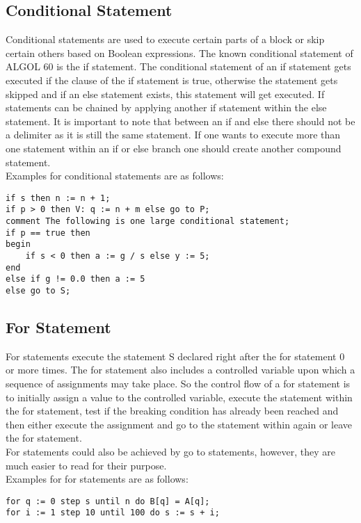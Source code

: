 \documentclass{article}
\begin{document}
\subsection{Conditional Statement}
Conditional statements are used to execute certain parts of a block or skip certain others based on Boolean expressions. The known conditional statement of ALGOL 60 is the if statement. The conditional statement of an if statement gets executed if the clause of the if statement is true, otherwise the statement gets skipped and if an else statement exists, this statement will get executed. If statements can be chained by applying another if statement within the else statement. It is important to note that between an if and else there should not be a delimiter as it is still the same statement. If one wants to execute more than one statement within an if or else branch one should create another compound statement.\\

Examples for conditional statements are as follows:\\ 
\begin{lstlisting}[language={[60]algol}]
if s then n := n + 1;
if p > 0 then V: q := n + m else go to P;
comment The following is one large conditional statement;
if p == true then 
begin 
    if s < 0 then a := g / s else y := 5; 
end
else if g != 0.0 then a := 5
else go to S;
\end{lstlisting}

\subsection{For Statement}
For statements execute the statement S declared right after the for statement 0 or more times. The for statement also includes a controlled variable upon which a sequence of assignments may take place. So the control flow of a for statement is to initially assign a value to the controlled variable, execute the statement within the for statement, test if the breaking condition has already been reached and then either execute the assignment and go to the statement within again or leave the for statement.\\
For statements could also be achieved by go to statements, however, they are much easier to read for their purpose.\\

Examples for for statements are as follows:\\ 
\begin{lstlisting}[language={[60]algol}]
for q := 0 step s until n do B[q] = A[q];
for i := 1 step 10 until 100 do s := s + i;
\end{lstlisting}
\end{document}

